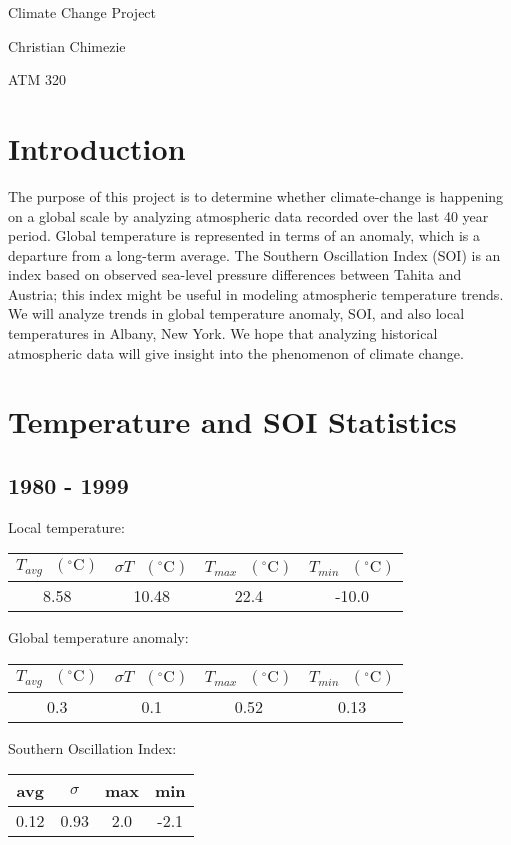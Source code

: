 \documentclass[12pt]{article}
\begin{document}
{\LARGE Climate Change Project}

{\large Christian Chimezie}

{\large ATM 320}

\noindent\makebox[\linewidth]{\rule{16.51cm}{0.4pt}}

\section*{Introduction}
The purpose of this project is to determine whether climate-change is
happening on a global scale by analyzing atmospheric data recorded
over the last 40 year period.
Global temperature is represented in terms of an anomaly,
which is a departure from a long-term average.
The Southern Oscillation Index (SOI) is an index based on observed
sea-level pressure differences between Tahita and Austria;
this index might be useful in modeling atmospheric temperature
trends.
We will analyze trends in global temperature anomaly, SOI, and also
local temperatures in Albany, New York.
We hope that analyzing historical atmospheric data will give insight
into the phenomenon of climate change.

\section*{Temperature and SOI Statistics}
\subsection*{1980 - 1999}
Local temperature:
\begin{center}
\begin{tabular}{c | c | c | c}
 $T_{avg} \textrm{ } (^{\circ} \textrm{C})$ &
 $\sigma T \textrm{ } (^{\circ} \textrm{C})$ &
 $T_{max} \textrm{ } (^{\circ} \textrm{C})$ &
 $T_{min} \textrm{ } (^{\circ} \textrm{C})$ \\ %
 \hline
 8.58 & 10.48 & 22.4 & -10.0 \\ %
\end{tabular}
\end{center}
Global temperature anomaly:
\begin{center}
\begin{tabular}{c | c | c | c}
 $T_{avg} \textrm{ } (^{\circ} \textrm{C})$ &
 $\sigma T \textrm{ } (^{\circ} \textrm{C})$ &
 $T_{max} \textrm{ } (^{\circ} \textrm{C})$ &
 $T_{min} \textrm{ } (^{\circ} \textrm{C})$ \\ %
 \hline
 0.3 & 0.1 & 0.52 & 0.13 \\ %
\end{tabular}
\end{center}
Southern Oscillation Index:
\begin{center}
\begin{tabular}{c | c | c | c}
 avg & $\sigma$ & max & min \\ %
 \hline
 0.12 & 0.93 & 2.0 & -2.1 \\ %
\end{tabular}
\end{center}
\end{document}
